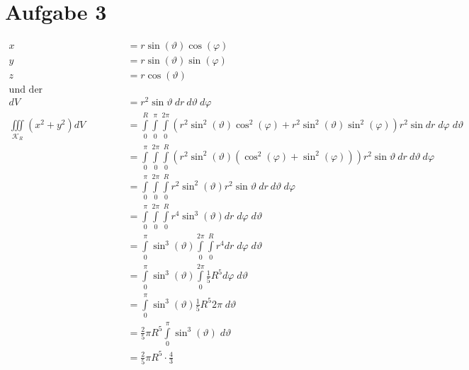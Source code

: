 \documentclass[10pt,a4paper,parskip=half]{scrartcl}
\begin{document}
\section*{Aufgabe 3}
\begin{align*}
x &= r \sin( \vartheta ) \cos(\varphi) \\
y &= r \sin(\vartheta) \sin(\varphi)\\
z &= r \cos( \vartheta)\\
\text{und der Funktionaldeterminanten} \\
dV &= r^2 \sin \vartheta~ dr ~d\vartheta ~d\varphi \\
\iiint\limits_{\mathcal{K}_R} \left( x^2 + y^2 \right) dV &= \int\limits_{0}^{R}\int\limits_{0}^{\pi} \int\limits_{0}^{2\pi} \left( r^2\sin^2(\vartheta)\cos^2(\varphi) + r^2\sin^2(\vartheta)\sin^2(\varphi) \right) r^2 \sin dr \; d\varphi \; d\vartheta\\ 
&= \int\limits_{0}^{\pi} \int\limits_{0}^{2\pi}\int\limits_{0}^{R} \left( r^2\sin^2(\vartheta) \left( \cos^2(\varphi) + \sin^2(\varphi) \right) \right)  r^2 \sin \vartheta~ dr ~d\vartheta ~d\varphi\\
&= \int\limits_{0}^{\pi} \int\limits_{0}^{2\pi}\int\limits_{0}^{R}  r^2\sin^2(\vartheta)  r^2 \sin \vartheta~ dr ~d\vartheta ~d\varphi\\
&= \int\limits_{0}^{\pi} \int\limits_{0}^{2\pi}\int\limits_{0}^{R}  r^4\sin^3(\vartheta) dr \; d\varphi \; d\vartheta\\
&= \int\limits_{0}^{\pi} \sin^3(\vartheta) \int\limits_{0}^{2\pi}\int\limits_{0}^{R} r^4 dr \; d\varphi \; d\vartheta\\
&= \int\limits_{0}^{\pi} \sin^3(\vartheta)  \int\limits_{0}^{2\pi} \frac 15 R^5 d\varphi \; d\vartheta\\
&= \int\limits_{0}^{\pi} \sin^3(\vartheta)\frac 15 R^5 2\pi \; d\vartheta\\
&= \frac 25 \pi R^5 \int\limits_0^{\pi} \sin^3(\vartheta) \; d\vartheta\\
&= \frac 25 \pi R^5 \cdot \frac 43
\end{align*}
\end{document}
